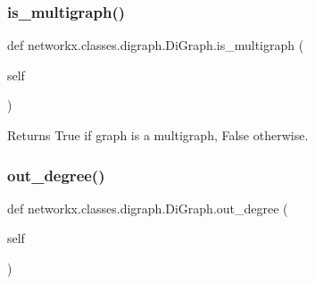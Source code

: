 \subsubsection{\texorpdfstring{is\+\_\+multigraph()}{is\_multigraph()}}
{\footnotesize\ttfamily def networkx.\+classes.\+digraph.\+Di\+Graph.\+is\+\_\+multigraph (\begin{DoxyParamCaption}\item[{}]{self }\end{DoxyParamCaption})}

\begin{DoxyVerb}Returns True if graph is a multigraph, False otherwise.\end{DoxyVerb}
 \mbox{\label{classnetworkx_1_1classes_1_1digraph_1_1DiGraph_a5c1d8ff06c6934905351b20ee01cd44a}} 
\subsubsection{\texorpdfstring{out\+\_\+degree()}{out\_degree()}}
{\footnotesize\ttfamily def networkx.\+classes.\+digraph.\+Di\+Graph.\+out\+\_\+degree (\begin{DoxyParamCaption}\item[{}]{self }\end{DoxyParamCaption})}

